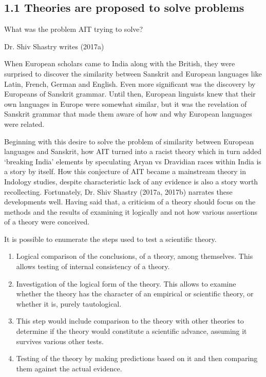 \subsection*{1.1 Theories are proposed to solve problems}

What was the problem AIT trying to solve?

Dr. Shiv Shastry writes (2017a)

\begin{myquote}
When European scholars came to India along with the British, they were surprised to discover the similarity between Sanskrit and European languages like Latin, French, German and English. Even more significant was the discovery by Europeans of Sanskrit grammar. Until then, European linguists knew that their own languages in Europe were somewhat similar, but it was the revelation of Sanskrit grammar that made them aware of how and why European languages were related.
\end{myquote}

Beginning with this desire to solve the problem of similarity between European languages and Sanskrit, how AIT turned into a racist theory which in turn added ‘breaking India’ elements by speculating Aryan vs Dravidian races within India is a story by itself. How this conjecture of AIT became a mainstream theory in Indology studies, despite characteristic lack of any evidence is also a story worth recollecting. Fortunately, Dr. Shiv Shastry (2017a, 2017b) narrates these developments well. Having said that, a criticism of a theory should focus on the methods and the results of examining it logically and not how various assertions of a theory were conceived.

It is possible to enumerate the steps used to test a scientific theory.

\begin{enumerate}[{\rm 1)}]
\itemsep=0pt
\item Logical comparison of the conclusions, of a theory, among themselves. This allows testing of internal consistency of a theory.

 \item Investigation of the logical form of the theory. This allows to examine whether the theory has the character of an empirical or scientific theory, or whether it is, purely tautological.

 \item This step would include comparison to the theory with other theories to determine if the theory would constitute a scientific advance, assuming it survives various other tests.

 \item Testing of the theory by making predictions based on it and then comparing them against the actual evidence.

\end{enumerate}

